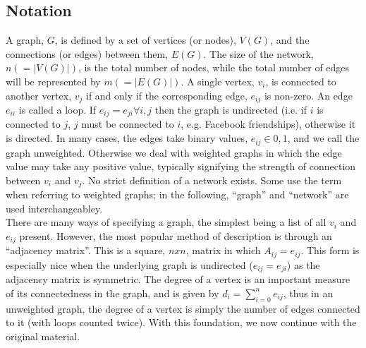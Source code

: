 \documentclass[11pt]{article}
\begin{document}
\subsection{Notation}
A graph, $G$, is defined by a set of vertices (or nodes), $V(G)$, and the connections (or edges) between them, $E(G)$. The size of the network, $n( = |V(G)|)$, is the total number of nodes, while the total number of edges will be represented by $m(= |E(G)|)$. A single vertex, $v_{i}$, is connected to another vertex, $v_{j}$ if and only if the corresponding edge, $e_{ij}$ is non-zero. An edge $e_{ii}$ is called a loop. If $e_{ij} = e_{ji} \forall i,j$ then the graph is undirected (i.e. if $i$ is connected to $j$, $j$ must be connected to $i$, e.g. Facebook friendships), otherwise it is directed. In many cases, the edges take binary values, $e_{ij} \in {0,1}$, and we call the graph unweighted. Otherwise we deal with weighted graphs in which the edge value may take any positive value, typically signifying the strength of connection between $v_{i}$ and $v_{j}$. No strict definition of a network exists. Some use the term when referring to weighted graphs; in the following, ``graph'' and ``network'' are used interchangeabley. \vspace{1mm}\\
There are many ways of specifying a graph, the simplest being a list of all $v_{i}$ and $e_{ij}$ present. However, the most popular method of description is through an ``adjacency matrix''. This is a square, $n x n$, matrix in which $A_{ij}=e_{ij}$. This form is especially nice when the underlying graph is undirected ($e_{ij}=e_{ji}$) as the adjacency matrix is symmetric. The degree of a vertex is an important measure of its connectedness in the graph, and is given by $d_{i}=\sum\limits_{i=0}^n e_{ij}$, thus in an unweighted graph, the degree of a vertex is simply the number of edges connected to it (with loops counted twice). With this foundation, we now continue with the original material.
\end{document}
